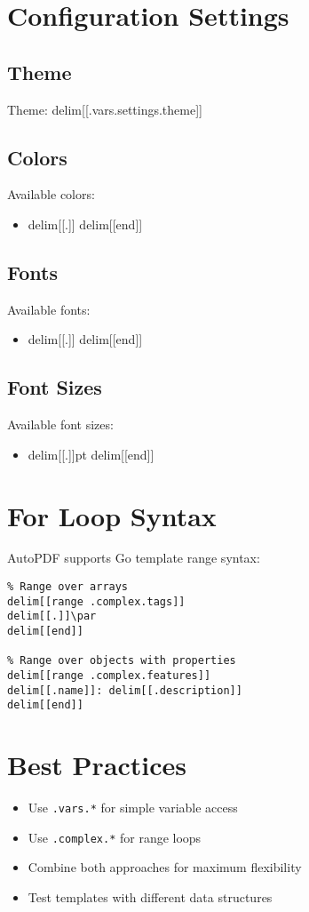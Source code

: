 \documentclass{article}
\begin{document}
\section{Configuration Settings}
\subsection{Theme}
Theme: delim[[.vars.settings.theme]]

\subsection{Colors}
Available colors:
\begin{itemize}
delim[[range .complex.settings.colors]]
\item delim[[.]]
delim[[end]]
\end{itemize}

\subsection{Fonts}
Available fonts:
\begin{itemize}
delim[[range .complex.settings.fonts]]
\item delim[[.]]
delim[[end]]
\end{itemize}

\subsection{Font Sizes}
Available font sizes:
\begin{itemize}
delim[[range .complex.settings.sizes]]
\item delim[[.]]pt
delim[[end]]
\end{itemize}

\section{For Loop Syntax}
AutoPDF supports Go template range syntax:

\begin{verbatim}
% Range over arrays
delim[[range .complex.tags]]
delim[[.]]\par
delim[[end]]

% Range over objects with properties
delim[[range .complex.features]]
delim[[.name]]: delim[[.description]]
delim[[end]]
\end{verbatim}

\section{Best Practices}
\begin{itemize}
\item Use \texttt{.vars.*} for simple variable access
\item Use \texttt{.complex.*} for range loops
\item Combine both approaches for maximum flexibility
\item Test templates with different data structures
\end{itemize}
\end{document}
